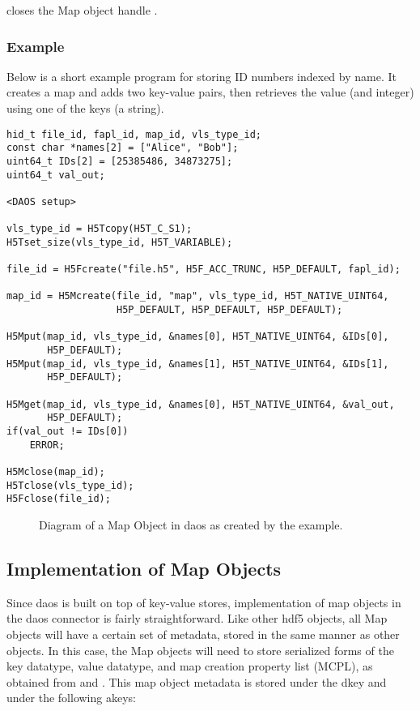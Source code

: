 \documentclass[../design_doc.tex]{subfiles}
\begin{document}
 closes the Map object handle .

\subsubsection{Example}

Below is a short example program for storing ID numbers indexed by name. It creates a map and adds two key-value pairs, then retrieves the value (and integer) using one of the keys (a string).
\begin{verbatim}
hid_t file_id, fapl_id, map_id, vls_type_id;
const char *names[2] = ["Alice", "Bob"];
uint64_t IDs[2] = [25385486, 34873275];
uint64_t val_out;

<DAOS setup>

vls_type_id = H5Tcopy(H5T_C_S1);
H5Tset_size(vls_type_id, H5T_VARIABLE);

file_id = H5Fcreate("file.h5", H5F_ACC_TRUNC, H5P_DEFAULT, fapl_id);

map_id = H5Mcreate(file_id, "map", vls_type_id, H5T_NATIVE_UINT64, 
                   H5P_DEFAULT, H5P_DEFAULT, H5P_DEFAULT);

H5Mput(map_id, vls_type_id, &names[0], H5T_NATIVE_UINT64, &IDs[0],
       H5P_DEFAULT);
H5Mput(map_id, vls_type_id, &names[1], H5T_NATIVE_UINT64, &IDs[1],
       H5P_DEFAULT);

H5Mget(map_id, vls_type_id, &names[0], H5T_NATIVE_UINT64, &val_out,
       H5P_DEFAULT);
if(val_out != IDs[0])
	ERROR;

H5Mclose(map_id);
H5Tclose(vls_type_id);
H5Fclose(file_id);
\end{verbatim}

\begin{figure}
\caption{Diagram of a Map Object in \acrshort{daos} as created by the example.}
\label{fig:map}
\end{figure}

\subsection{Implementation of Map Objects}

Since \acrshort{daos} is built on top of key-value stores, implementation of map objects in the \acrshort{daos} \gls{connector} is fairly straightforward. Like other \acrshort{hdf5} objects, all Map objects will have a certain set of metadata, stored in the same manner as other objects. In this case, the Map objects will need to store serialized forms of the key datatype, value datatype, and map creation property list (MCPL), as obtained from  and .
This map object metadata is stored under the  \gls{dkey} and under the following \glspl{akey}:
\end{document}
